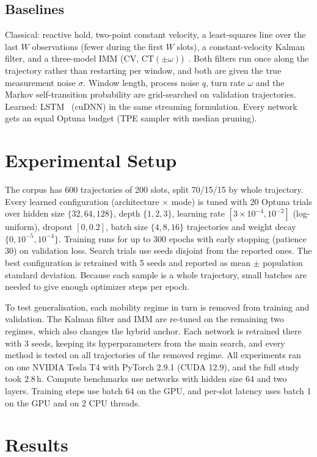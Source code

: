 \documentclass[conference]{IEEEtran}
\begin{document}
\subsection{Baselines}
Classical: reactive hold, two-point constant velocity, a least-squares line
over the last $W$ observations (fewer during the first $W$ slots), a
constant-velocity Kalman filter, and a three-model IMM (CV,
CT$(\pm\omega)$)~\cite{blom1988imm}. Both filters run once along the trajectory
rather than restarting per window, and both are given the true measurement
noise $\sigma$. Window length, process noise $q$, turn rate $\omega$ and the
Markov self-transition probability are grid-searched on validation
trajectories. Learned: LSTM~\cite{hochreiter1997lstm} (cuDNN) in the same
streaming formulation. Every network gets an equal Optuna budget (TPE sampler
with median pruning).

\section{Experimental Setup}
The corpus has 600 trajectories of 200 slots, split 70/15/15 by whole
trajectory. Every learned configuration (architecture $\times$ mode) is tuned
with 20 Optuna trials over hidden size $\{32,64,128\}$, depth $\{1,2,3\}$,
learning rate $[3\times10^{-4}, 10^{-2}]$ (log-uniform), dropout $[0,0.2]$,
batch size $\{4,8,16\}$ trajectories and weight decay $\{0,10^{-5},10^{-4}\}$.
Training runs for up to 300 epochs with early stopping (patience 30) on
validation loss. Search trials use seeds disjoint from the reported ones. The
best configuration is retrained with 5 seeds and reported as mean $\pm$
population standard deviation. Because each sample is a whole trajectory,
small batches are needed to give enough optimizer steps per epoch.

To test generalisation, each mobility regime in turn is removed from training
and validation. The Kalman filter and IMM are re-tuned on the remaining two
regimes, which also changes the hybrid anchor. Each network is retrained there
with 3 seeds, keeping its hyperparameters from the main search, and every
method is tested on all trajectories of the removed regime.
All experiments ran on one NVIDIA Tesla T4 with PyTorch 2.9.1 (CUDA 12.9),
and the full study took 2.8\,h. Compute benchmarks use networks with hidden
size 64 and two layers. Training steps use batch 64 on the GPU, and per-slot
latency uses batch 1 on the GPU and on 2 CPU threads.

\section{Results}
\end{document}
